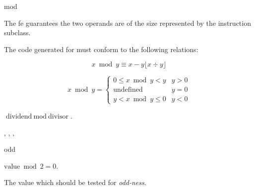 \begin{instruction}{mod}

  \begin{notes}
    The \ac{fe} guarantees the two operands are of the size
    represented by the instruction subclass.

    The code generated for  must conform to the following
    relations:

    \[ x \bmod y \equiv x - y \lfloor {x \div y} \rfloor \]

    \[x \bmod y = \left\{
      \begin{array}{l|l}
        0 \leq x \bmod y < y & y > 0 \\
        \mbox{undefined} & y = 0 \\
        y < x \bmod y \leq 0 & y < 0
      \end{array}
      \right. \]
  \end{notes}

  \begin{results}
  \item $\textrm{dividend} \bmod \textrm{divisor}$.
  \end{results}

  \begin{operands}
  \item {}
  \item {}
  \end{operands}

  \begin{seealso}
    , ,
    , 
  \end{seealso}
\end{instruction}

\begin{instruction}{odd}

  \begin{results}
  \item $\textrm{value} \bmod 2 = 0$.
  \end{results}

  \begin{operands}
  \item The value which should be tested for \emph{odd-ness}.
  \end{operands}
\end{instruction}

